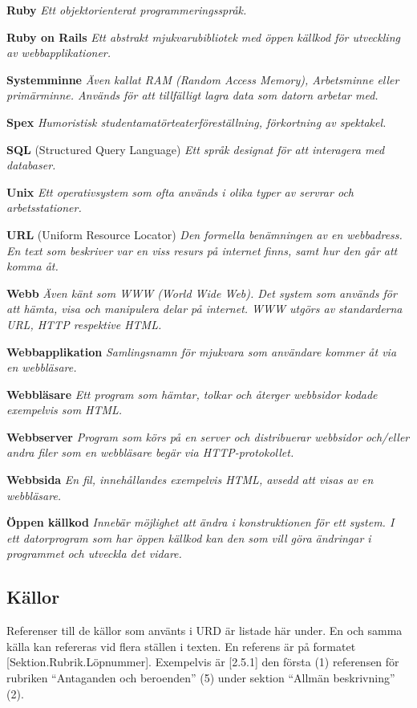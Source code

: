 \documentclass[a4paper, twoside, 11pt, titlepage]{article}
\begin{document}
	\textbf{Ruby} \emph{Ett objektorienterat programmeringsspråk.}

	\textbf{Ruby on Rails} \emph{Ett abstrakt mjukvarubibliotek med öppen källkod för utveckling av webbapplikationer.}

	\textbf{Systemminne} \emph{Även kallat RAM (Random Access Memory), Arbetsminne eller primärminne. Används för att tillfälligt lagra data som datorn arbetar med.}

	\textbf{Spex} \emph{Humoristisk studentamatörteaterföreställning, förkortning av spektakel.}

	\textbf{SQL} (Structured Query Language) \emph{Ett språk designat för att interagera med databaser.}

	\textbf{Unix} \emph{Ett operativsystem som ofta används i olika typer av servrar och arbetsstationer.}

	\textbf{URL} (Uniform Resource Locator) \emph{Den formella benämningen av en webbadress. En text som beskriver var en viss resurs på internet finns, samt hur den går att komma åt.}

	\textbf{Webb} \emph{Även känt som WWW (World Wide Web). Det system som används för att hämta, visa och manipulera delar på internet. WWW utgörs av standarderna URL, HTTP respektive HTML.}

	\textbf{Webbapplikation} \emph{Samlingsnamn för mjukvara som användare kommer åt via en webbläsare.}

	\textbf{Webbläsare} \emph{Ett program som hämtar, tolkar och återger webbsidor kodade exempelvis som HTML.}

	\textbf{Webbserver} \emph{Program som körs på en server och distribuerar webbsidor och/eller andra filer som en webbläsare begär via HTTP-protokollet.}

	\textbf{Webbsida} \emph{En fil, innehållandes exempelvis HTML, avsedd att visas av en webbläsare.}

	\textbf{Öppen källkod} \emph{Innebär möjlighet att ändra i konstruktionen för ett system. I ett datorprogram som har öppen källkod kan den som vill göra ändringar i programmet och utveckla det vidare.}

	\subsection{Källor}


	Referenser till de källor som använts i URD är listade här under. En och samma källa kan refereras vid flera ställen i texten. En referens är på formatet [Sektion.Rubrik.Löpnummer]. Exempelvis är [2.5.1] den första (1) referensen för rubriken ``Antaganden och beroenden'' (5) under sektion ``Allmän beskrivning'' (2).
\end{document}
